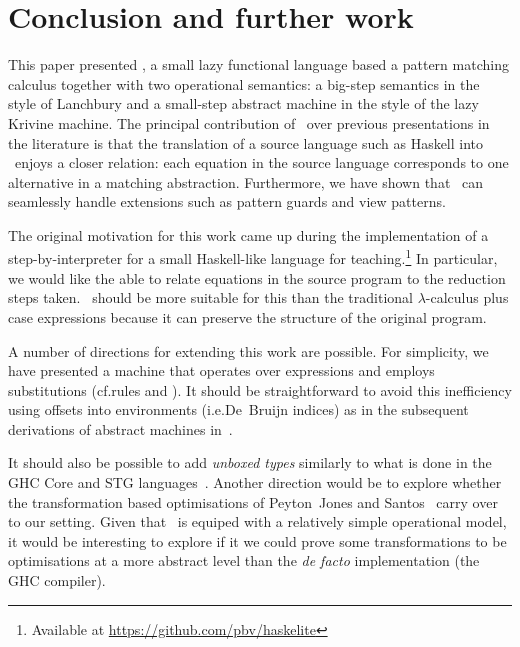 
\section{Conclusion and further work}\label{sec:conclusion}

This paper presented \lambdaPMC, a small lazy functional language
based a pattern matching calculus together with two operational
semantics: a big-step semantics in the style of Lanchbury and a
small-step abstract machine in the style of the lazy Krivine machine.
The principal contribution of \lambdaPMC\ over previous presentations
in the literature is that the translation of a source language such as
Haskell into \lambdaPMC\ enjoys a closer relation: each equation in
the source language corresponds to one alternative in a matching
abstraction.  Furthermore, we have shown that \lambdaPMC\ can
seamlessly handle extensions such as pattern guards and view patterns.

The original motivation for this work came up during the
implementation of a step-by-interpreter for a small Haskell-like
language for teaching.\footnote{Available at
  \url{https://github.com/pbv/haskelite}} In particular, we would like
the able to relate equations in the source program to the reduction
steps taken.  \lambdaPMC\ should be more suitable for this than the
traditional $\lambda$-calculus plus case expressions because
it can preserve the structure of the original program.

A number of directions for extending this work are possible.  For
simplicity, we have presented a machine that operates over expressions
and employs substitutions (cf.\@ rules  and
).  It should be straightforward to avoid this
inefficiency using offsets into environments (i.e.\@ De~Bruijn
indices) as in the subsequent derivations of abstract machines
in~\cite{sestof_1997}.

It should also be possible to add \emph{unboxed types} similarly to
what is done in the GHC Core and STG languages~\cite{jones_1992}.
Another direction would be to explore whether the transformation based
optimisations of Peyton~Jones and Santos~\cite{peytonjones_1997a}
carry over to our setting.  Given that \lambdaPMC\ is equiped with a
relatively simple operational model, it would be interesting to
explore if it we could prove some transformations to be optimisations
at a more abstract level than the \emph{de facto} implementation (the
GHC compiler).



